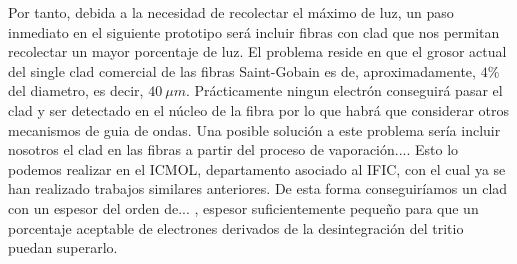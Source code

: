 Por tanto, debida a la necesidad de recolectar el máximo de luz, un paso inmediato en el siguiente prototipo será incluir fibras con clad que nos permitan recolectar un mayor porcentaje de luz. El problema reside en que el grosor actual del single clad comercial de las fibras Saint-Gobain es de, aproximadamente, $4\%$ del diametro, es decir, $40~\mu m$. Prácticamente ningun electrón conseguirá pasar el clad y ser detectado en el núcleo de la fibra por lo que habrá que considerar otros mecanismos de guia de ondas. Una posible solución a este problema sería incluir nosotros el clad en las fibras a partir del proceso de vaporación.... Esto lo podemos realizar en el ICMOL, departamento asociado al IFIC, con el cual ya se han realizado trabajos similares anteriores. De esta forma conseguiríamos un clad con un espesor del orden de... , espesor suficientemente pequeño para que un porcentaje aceptable de electrones derivados de la desintegración del tritio puedan superarlo.